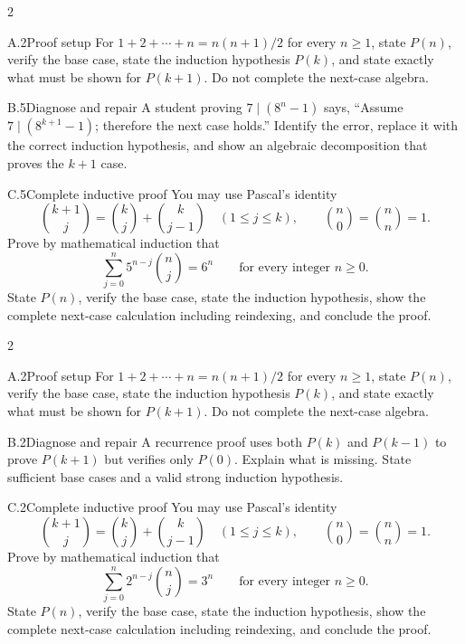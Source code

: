 \documentclass[9pt]{extarticle}
\begin{document}
\CoreWorkArea
\FormBreak
{}
\begin{multicols}{2}
\begin{CompactCoreProblem}{A.2}{Proof setup}
For $1+2+\cdots+n=n(n+1)/2$ for every $n\ge1$, state $P(n)$, verify the base case, state the induction hypothesis $P(k)$, and state exactly what must be shown for $P(k+1)$. Do not complete the next-case algebra.
\end{CompactCoreProblem}
\begin{CompactCoreProblem}{B.5}{Diagnose and repair}
A student proving $7\mid(8^n-1)$ says, “Assume $7\mid(8^{k+1}-1)$; therefore the next case holds.” Identify the error, replace it with the correct induction hypothesis, and show an algebraic decomposition that proves the $k+1$ case.
\end{CompactCoreProblem}
\end{multicols}
\begin{CompactCoreProblem}{C.5}{Complete inductive proof}
You may use Pascal's identity
\[
\binom{k+1}{j}=\binom{k}{j}+\binom{k}{j-1}
\quad(1\le j\le k),\qquad
\binom{n}{0}=\binom{n}{n}=1.
\]
Prove by mathematical induction that
\[
\sum_{j=0}^{n} 5^{n-j}\binom{n}{j}=6^n\qquad\text{for every integer }n\ge0.
\]
State $P(n)$, verify the base case, state the induction hypothesis, show the complete next-case calculation including reindexing, and conclude the proof.
\end{CompactCoreProblem}
\CoreWorkArea
\FormBreak
{}
\begin{multicols}{2}
\begin{CompactCoreProblem}{A.2}{Proof setup}
For $1+2+\cdots+n=n(n+1)/2$ for every $n\ge1$, state $P(n)$, verify the base case, state the induction hypothesis $P(k)$, and state exactly what must be shown for $P(k+1)$. Do not complete the next-case algebra.
\end{CompactCoreProblem}
\begin{CompactCoreProblem}{B.2}{Diagnose and repair}
A recurrence proof uses both $P(k)$ and $P(k-1)$ to prove $P(k+1)$ but verifies only $P(0)$. Explain what is missing. State sufficient base cases and a valid strong induction hypothesis.
\end{CompactCoreProblem}
\end{multicols}
\begin{CompactCoreProblem}{C.2}{Complete inductive proof}
You may use Pascal's identity
\[
\binom{k+1}{j}=\binom{k}{j}+\binom{k}{j-1}
\quad(1\le j\le k),\qquad
\binom{n}{0}=\binom{n}{n}=1.
\]
Prove by mathematical induction that
\[
\sum_{j=0}^{n} 2^{n-j}\binom{n}{j}=3^n\qquad\text{for every integer }n\ge0.
\]
State $P(n)$, verify the base case, state the induction hypothesis, show the complete next-case calculation including reindexing, and conclude the proof.
\end{CompactCoreProblem}
\end{document}
